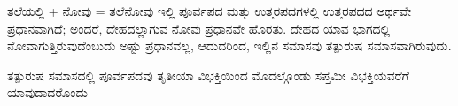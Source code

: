 \indent ತಲೆಯಲ್ಲಿ + ನೋವು = ತಲೆನೋವು ಇಲ್ಲಿ ಪೂರ್ವಪದ ಮತ್ತು ಉತ್ತರಪದಗಳಲ್ಲಿ ಉತ್ತರಪದದ ಅರ್ಥವೇ ಪ್ರಧಾನವಾಗಿದೆ; ಅಂದರೆ, ದೇಹದಲ್ಲಾಗುವ ನೋವು ಪ್ರಧಾನವೇ ಹೊರತು. ದೇಹದ ಯಾವ ಭಾಗದಲ್ಲಿ ನೋವಾಗುತ್ತಿರುವುದೆಂಬುದು ಅಷ್ಟು ಪ್ರಧಾನವಲ್ಲ, ಆದುದರಿಂದ, ಇಲ್ಲಿನ ಸಮಾಸವು ತತ್ಪುರುಷ ಸಮಾಸವಾಗಿರುವುದು.\par

\begin{kbvrule}
\noindent\kbvbullet\hspace{0.5em}ತತ್ಪುರುಷ ಸಮಾಸದಲ್ಲಿ ಪೂರ್ವಪದವು ತೃತೀಯಾ ವಿಭಕ್ತಿಯಿಂದ ಮೊದಲ್ಗೊಂಡು ಸಪ್ತಮೀ ವಿಭಕ್ತಿಯವರೆಗೆ ಯಾವುದಾದರೊಂದು
\end{kbvrule}

